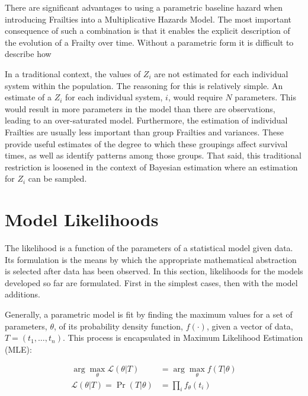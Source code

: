 There are significant advantages to using a parametric baseline hazard when introducing Frailties into a Multiplicative Hazards Model. The most important consequence of such a combination is that it enables the explicit description of the evolution of a Frailty over time. Without a parametric form it is difficult to describe how 

In a traditional context, the values of $Z_i$ are not estimated for each individual system within the population. The reasoning for this is relatively simple. An estimate of a $Z_i$ for each individual system, $i$, would require $N$ parameters. This would result in more parameters in the model than there are observations, leading to an over-saturated model. Furthermore, the estimation of individual Frailties are usually less important than group Frailties and variances. These provide useful estimates of the degree to which these groupings affect survival times, as well as identify patterns among those groups. That said, this traditional restriction is loosened in the context of Bayesian estimation where an estimation for $Z_i$ can be sampled.





\section*{Model Likelihoods}

The likelihood is a function of the parameters of a statistical model given data. Its formulation is the means by which the appropriate mathematical abstraction is selected after data has been observed. In this section, likelihoods for the models developed so far are formulated. First in the simplest cases, then with the model additions.

Generally, a parametric model is fit by finding the maximum values for a set of parameters, $\theta$, of its probability density function, $f(\cdot)$, given a vector of data, $T = (t_1, \dots, t_n)$. This process is encapsulated in Maximum Likelihood Estimation (MLE):

\begin{align*}
\displaystyle \arg \max _{\theta }{\mathcal {L}}(\theta | T) &= \arg \max _{\theta }f(T|\theta ) \\
{\mathcal {L}}(\theta | T) = \Pr(T | \theta) &= \prod_i f_{\theta}(t_i)
\end{align*}

